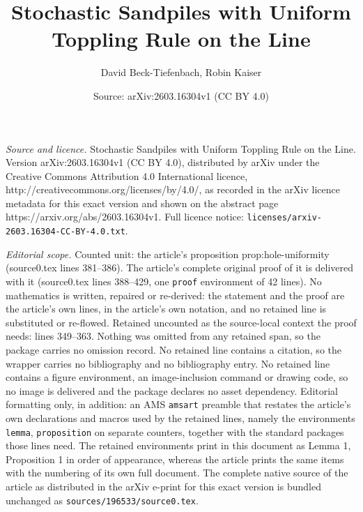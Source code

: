 \documentclass[10pt,a4paper]{amsart}
\title{Stochastic Sandpiles with Uniform Toppling Rule on the Line}
\author{David Beck-Tiefenbach, Robin Kaiser}
\date{Source: arXiv:2603.16304v1 (CC BY 4.0)}
\begin{document}
\maketitle

\noindent\emph{Source and licence.} Stochastic Sandpiles with Uniform Toppling Rule on the Line. Version arXiv:2603.16304v1 (CC BY 4.0), distributed by arXiv under the Creative Commons Attribution 4.0 International licence, http://creativecommons.org/licenses/by/4.0/, as recorded in the arXiv licence metadata for this exact version and shown on the abstract page https://arxiv.org/abs/2603.16304v1. Full licence notice: \texttt{licenses/arxiv-2603.16304-CC-BY-4.0.txt}.\par\smallskip

\noindent\textit{Editorial scope.} Counted unit: the article's proposition prop:hole-uniformity (source0.tex lines 381--386). The article's complete original proof of it is delivered with it (source0.tex lines 388--429, one \texttt{proof} environment of 42 lines). No mathematics is written, repaired or re-derived: the statement and the proof are the article's own lines, in the article's own notation, and no retained line is substituted or re-flowed.  Retained uncounted as the source-local context the proof needs: lines 349--363.  Nothing was omitted from any retained span, so the package carries no omission record.  No retained line contains a citation, so the wrapper carries no bibliography and no bibliography entry.  No retained line contains a figure environment, an image-inclusion command or drawing code, so no image is delivered and the package declares no asset dependency.  Editorial formatting only, in addition: an AMS \texttt{amsart} preamble that restates the article's own declarations and macros used by the retained lines, namely the environments \texttt{lemma}, \texttt{proposition} on separate counters, together with the standard packages those lines need.  The retained environments print in this document as Lemma 1, Proposition 1 in order of appearance, whereas the article prints the same items with the numbering of its own full document.  The complete native source of the article as distributed in the arXiv e-print for this exact version is bundled unchanged as \texttt{sources/196533/source0.tex}.
\end{document}
